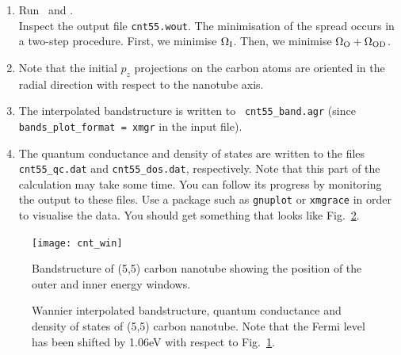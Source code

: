 \documentclass[a4paper,11pt,twoside]{article}
\begin{document}
\begin{enumerate}
\item Run \pwscf\ and \wannier.\\
Inspect the output file {\tt cnt55.wout}. The minimisation of the
spread occurs in a two-step procedure. First, we minimise $\Omega_{\rm
  I}$. Then, we minimise $\Omega_{\rm O}+\Omega_{{\rm OD}}$.
\item Note that the initial $p_{z}$ projections on the carbon atoms
are oriented in the radial direction with respect to the nanotube
axis.
\item The interpolated bandstructure is written to {\tt
cnt55\_band.agr} (since {\tt bands\_plot\_format = xmgr} in the input
file).
\item The quantum conductance and density of states are written to the
files {\tt cnt55\_qc.dat} and {\tt cnt55\_dos.dat}, respectively. 
Note that this part of the calculation may take some time. You can 
follow its progress by monitoring the output to these files. 
Use a package such as {\tt gnuplot} or {\tt xmgrace} in order to visualise
the data. You should get something that looks like Fig.~\ref{fig:cnt.tran}.
\end{enumerate}

\begin{figure}[h]
\begin{center}
\texttt{[image: cnt\_win]}
\caption{Bandstructure of (5,5) carbon nanotube showing the position
  of the outer and inner energy windows.}
\label{fig:cnt.win}
\end{center}
\end{figure}

\begin{figure}[h]
\begin{center}
\caption{Wannier interpolated bandstructure, quantum conductance and
density of states of (5,5) carbon nanotube. Note that the Fermi level has been shifted 
by 1.06eV with respect to Fig.~\ref{fig:cnt.win}.}
\label{fig:cnt.tran}
\end{center}
\end{figure}


\end{document}
